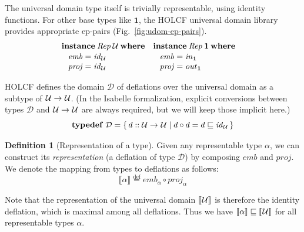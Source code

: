 \documentclass{sigplanconf}
\newcommand{\U}{\ensuremath{\mathcal{U}}}
\newcommand{\D}{\ensuremath{\mathcal{D}}}
\newcommand{\below}{\sqsubseteq}
\newcommand{\REP}[1]{\ensuremath{\llbracket#1\rrbracket}}
\newcommand{\hsone}{\mathbf{1}}
\newcommand{\hair}{\mskip1mu}
\newcommand{\kwd}[1]{\mathbf{#1}}
\newcommand{\hsc}[1]{\ensuremath{\mathit{#1}}}
\newcommand{\hsid}{\hsc{id}}
\newcommand{\hsemb}{\hsc{emb}}
\newcommand{\hsproj}{\hsc{proj}}
\newcommand{\hsRep}{\hsc{Rep}}
\newcommand{\embedding}{\hsc{in}}
\newcommand{\projection}{\hsc{out}}
\newcommand{\tA}{\alpha}
\newcommand{\defeq}{\stackrel{\mathrm{def}}{=}}
\theoremstyle{definition}
\newtheorem{definition}{Definition}
\begin{document}
The universal domain type itself is trivially representable, using identity functions. For other base types like $\hsone$, the HOLCF universal domain library provides appropriate ep-pairs (Fig.~\ref{fig:udom-ep-pairs}).
%
\begin{align*}
&
\begin{aligned}
  & \kwd{instance}\:\hsRep\:\U\:\kwd{where} \\[-\jot]
  & \hspace{8pt}
  \begin{alignedat}{2}
    & \hsemb &&= \hsid_\U \\[-\jot]
    & \hsproj &&= \hsid_\U
  \end{alignedat}
\end{aligned}
&&
\begin{aligned}
  & \kwd{instance}\:\hsRep\:\hsone\:\kwd{where} \\[-\jot]
  & \hspace{8pt}
  \begin{alignedat}{2}
    & \hsemb &&= \embedding_\hsone \\[-\jot]
    & \hsproj &&= \projection_\hsone
  \end{alignedat}
\end{aligned}
\end{align*}

HOLCF defines the domain $\D$ of deflations over the universal domain as a subtype of $\U\to\hair\U$. (In the Isabelle formalization, explicit conversions between types $\D$ and $\hair\U\to\hair\U$ are always required, but we will keep those implicit here.)
%
\begin{equation}
\kwd{typedef}\;\D = \{\,d::\U\to\hair\U \mid {d}\circ{d}={d}\below\hsid_\U\,\}
\end{equation}

\begin{definition}[Representation of a type]
Given any representable type $\tA$, we can construct its \emph{representation} (a deflation of type $\D$) by composing \hsc{emb} and \hsc{proj}. We denote the mapping from types to deflations as follows:
%
\begin{equation*}
\REP{\tA} \defeq \hsemb_\tA \circ \hsproj_\tA
\end{equation*}
\end{definition}

Note that the representation of the universal domain $\REP{\hair\U}$ is therefore the identity deflation, which is maximal among all deflations. Thus we have $\REP{\tA} \below \REP{\hair\U}$ for all representable types $\tA$.
\end{document}

